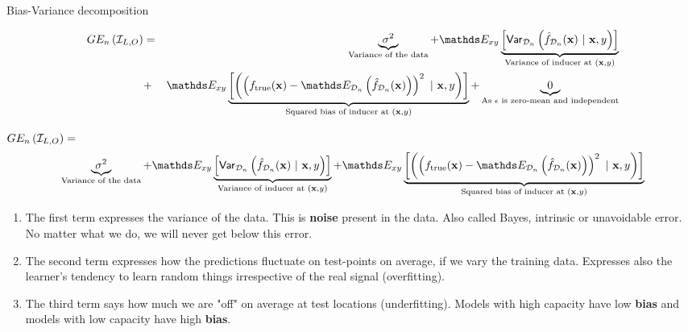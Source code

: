 \documentclass[11pt,compress,t,notes=noshow, xcolor=table]{beamer}
\begin{document}
\begin{vbframe} {Bias-Variance decomposition}
\begin{footnotesize}
\begin{eqnarray*}
\GEind 
  &=& \underbrace{\sigma^2}_{\text{Variance of the data}} + \E_{xy}\underbrace{\left[\var_{\D_n}\left(\fh_{\D_n}(\xv) ~|~\xv, y\right)\right]}_{\text{Variance of inducer at } (\xv, y)} \\ &+& \E_{xy}\underbrace{\left[\left(\left(\ftrue(\xv)-\E_{\D_n}\left(\fh_{\D_n}(\xv)\right)\right)^2~|~\xv, y\right)\right]}_{\text{Squared bias of inducer at } (\xv, y)} + \underbrace{0}_{\text{As $\epsilon$ is zero-mean and independent}}
\end{eqnarray*}
\end{footnotesize}


\framebreak 

\begin{footnotesize}
$GE_n\left(\mathcal{I}_{L, O}\right) =$  
$$
 \underbrace{\sigma^2}_{\text{Variance of the data}} + \E_{xy}\underbrace{\left[\var_{\D_n}\left(\fh_{\D_n}(\xv) ~|~\xv, y\right)\right]}_{\text{Variance of inducer at } (\xv, y)} + \E_{xy}\underbrace{\left[\left(\left(\ftrue(\xv)-\E_{\D_n}\left(\fh_{\D_n}(\xv)\right)\right)^2~|~\xv, y\right)\right]}_{\text{Squared bias of inducer at } (\xv, y)}  
$$
\end{footnotesize}
\begin{enumerate}
  \item The first term expresses the variance of the data. 
    This is \textbf{noise} present in the data.
    Also called Bayes, intrinsic or unavoidable error.
    No matter what we do, we will never get below this error.
  \item The second term expresses how the predictions fluctuate on test-points on average, if we vary the training data. Expresses also the learner's tendency to learn random things irrespective of the real signal (overfitting).
  \item The third term says how much we are "off" on average at test locations (underfitting).
    Models with high capacity have low \textbf{bias} and models with low capacity have high \textbf{bias}.
\end{enumerate}



\end{vbframe}
\end{document}
